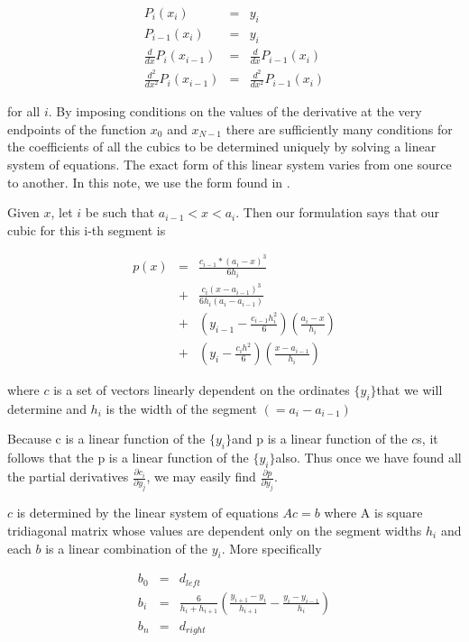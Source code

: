 \documentclass[a4paper]{article}
\newcommand{\yi}{\ensuremath{\{y_i\}}}
\begin{document}
\begin{eqnarray}
P_i(x_i) &=& y_i \\
P_{i-1}(x_i) &=& y_i \\
\frac{d}{dx}P_i(x_{i-1}) &=& \frac{d}{dx}P_{i-1}(x_i) \\
\frac{d^2}{dx^2}P_i(x_{i-1}) &=& \frac{d^2}{dx^2}P_{i-1}(x_i) 
\end{eqnarray}

for all $i$. By imposing conditions on the values of the derivative at the very endpoints of the function $x_0$ and $x_{N-1}$ there are sufficiently many conditions for the coefficients of all the cubics to be determined uniquely by solving a linear system of equations. The exact form of this linear system varies from one source to another. In this note, we use the form found in \cite{book:SONA}.

Given $x$, let $i$ be such that $a_{i-1} < x < a_i$.
Then our formulation says that our cubic for this i-th segment is

\begin{eqnarray}
p(x) &=& \frac{c_{i-1}*(a_i-x)^3}{6h_i} \nonumber\\
&+& \frac{c_i(x-a_{i-1})^3}{6h_i(a_i-a_{i-1})} \nonumber\\
&+& (y_{i-1} - \frac{c_{i-1}h_i^2}{6})(\frac{a_i-x}{h_i}) \nonumber\\
&+& (y_i - \frac{c_{i}h^2}{6})(\frac{x-a_{i-1}}{h_i})
\end{eqnarray}

where $c$ is a set of vectors linearly dependent on the ordinates \yi that we will determine and $h_i$ is the width of the segment $(=a_i-a_{i-1})$

Because c is a linear function of the \yi  and p is a linear function of the $c$s, it follows that the p is a linear function of the \yi also. Thus once we have found all the partial derivatives $\frac{\partial{c_i}}{\partial{y_j}}$, we may easily find $\frac{\partial{p} }{\partial{y_j}}$.

$c$ is determined by the linear system of equations $Ac=b$ where A is square tridiagonal matrix whose values are dependent only on the segment widths $h_i$ and each $b$ is a linear combination of the $y_i$. More specifically 

\begin{eqnarray}
b_0 &=& d_{left} \nonumber\\
b_i &=& \frac{6}{h_i+h_{i+1}}(\frac{y_{i+1}-y_i}{h_{i+1}} - \frac{y_i - y_{i-1}}{h_{i}}) \nonumber\\
b_n &=& d_{right}
\end{eqnarray}
\end{document}

